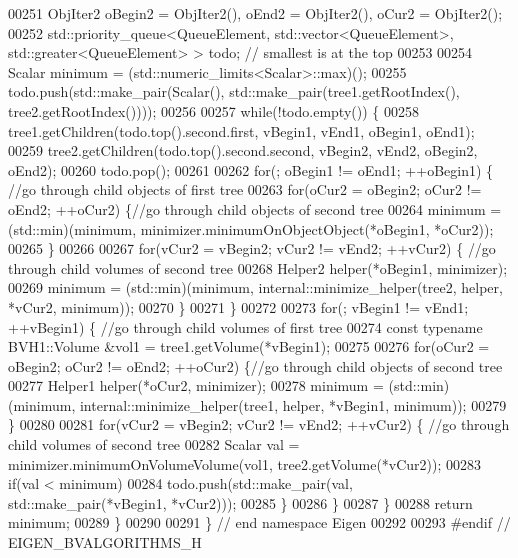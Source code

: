 \begin{DoxyCode}
00251   ObjIter2 oBegin2 = ObjIter2(), oEnd2 = ObjIter2(), oCur2 = ObjIter2();
00252   std::priority\_queue<QueueElement, std::vector<QueueElement>, std::greater<QueueElement> > todo; \textcolor{comment}{//
      smallest is at the top}
00253 
00254   Scalar minimum = (std::numeric\_limits<Scalar>::max)();
00255   todo.push(std::make\_pair(Scalar(), std::make\_pair(tree1.getRootIndex(), tree2.getRootIndex())));
00256 
00257   \textcolor{keywordflow}{while}(!todo.empty()) \{
00258     tree1.getChildren(todo.top().second.first, vBegin1, vEnd1, oBegin1, oEnd1);
00259     tree2.getChildren(todo.top().second.second, vBegin2, vEnd2, oBegin2, oEnd2);
00260     todo.pop();
00261 
00262     \textcolor{keywordflow}{for}(; oBegin1 != oEnd1; ++oBegin1) \{ \textcolor{comment}{//go through child objects of first tree}
00263       \textcolor{keywordflow}{for}(oCur2 = oBegin2; oCur2 != oEnd2; ++oCur2) \{\textcolor{comment}{//go through child objects of second tree}
00264         minimum = (std::min)(minimum, minimizer.minimumOnObjectObject(*oBegin1, *oCur2));
00265       \}
00266 
00267       \textcolor{keywordflow}{for}(vCur2 = vBegin2; vCur2 != vEnd2; ++vCur2) \{ \textcolor{comment}{//go through child volumes of second tree}
00268         Helper2 helper(*oBegin1, minimizer);
00269         minimum = (std::min)(minimum, internal::minimize\_helper(tree2, helper, *vCur2, minimum));
00270       \}
00271     \}
00272 
00273     \textcolor{keywordflow}{for}(; vBegin1 != vEnd1; ++vBegin1) \{ \textcolor{comment}{//go through child volumes of first tree}
00274       \textcolor{keyword}{const} \textcolor{keyword}{typename} BVH1::Volume &vol1 = tree1.getVolume(*vBegin1);
00275 
00276       \textcolor{keywordflow}{for}(oCur2 = oBegin2; oCur2 != oEnd2; ++oCur2) \{\textcolor{comment}{//go through child objects of second tree}
00277         Helper1 helper(*oCur2, minimizer);
00278         minimum = (std::min)(minimum, internal::minimize\_helper(tree1, helper, *vBegin1, minimum));
00279       \}
00280 
00281       \textcolor{keywordflow}{for}(vCur2 = vBegin2; vCur2 != vEnd2; ++vCur2) \{ \textcolor{comment}{//go through child volumes of second tree}
00282         Scalar val = minimizer.minimumOnVolumeVolume(vol1, tree2.getVolume(*vCur2));
00283         \textcolor{keywordflow}{if}(val < minimum)
00284           todo.push(std::make\_pair(val, std::make\_pair(*vBegin1, *vCur2)));
00285       \}
00286     \}
00287   \}
00288   \textcolor{keywordflow}{return} minimum;
00289 \}
00290 
00291 \} \textcolor{comment}{// end namespace Eigen}
00292 
00293 \textcolor{preprocessor}{#endif // EIGEN\_BVALGORITHMS\_H}
\end{DoxyCode}
